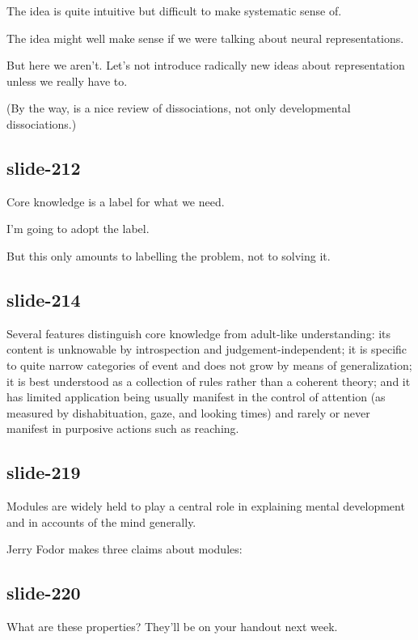 \documentclass[12pt,\papersize]{extarticle}
\begin{document}
The idea is quite intuitive but difficult to make systematic sense of.
 
The idea might well make sense if we were talking about neural representations.
 
But here we aren't.  Let's not introduce radically new ideas about representation unless we really have to.
 
(By the way, \citet{Munakata:2001ch} is a nice review of dissociations, not only developmental dissociations.)
 
\subsection{slide-212}
Core knowledge is a label for what we need.
 
I'm going to adopt the label.
 
But this only amounts to labelling the problem, not to solving it.
 
\subsection{slide-214}
Several features distinguish core knowledge from adult-like understanding: its content is unknowable by introspection and judgement-independent; it is specific to quite narrow categories of event and does not grow by means of generalization; it is best understood as a collection of rules rather than a coherent theory; and it has limited application being usually manifest in the control of attention (as measured by dishabituation, gaze, and looking times) and rarely or never manifest in purposive actions such as reaching.
 
\subsection{slide-219}
Modules are widely held to play a central role in explaining mental development and in accounts of the mind generally.
 
Jerry Fodor makes three claims about modules:
 
\subsection{slide-220}
What are these properties?  They'll be on your handout next week.
 
\end{document}
